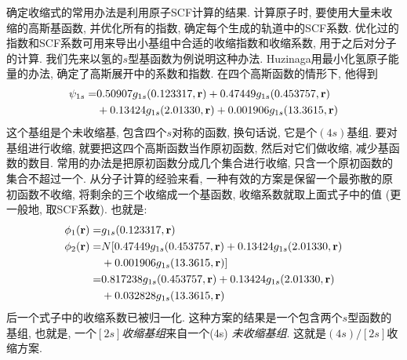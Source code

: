 确定收缩式的常用办法是利用原子SCF计算的结果. 计算原子时, 要使用大量未收缩的高斯基函数, 并优化所有的指数, 确定每个生成的轨道中的SCF系数. 优化过的指数和SCF系数可用来导出小基组中合适的收缩指数和收缩系数, 用于之后对分子的计算. 我们先来以氢的$s$型基函数为例说明这种办法. Huzinaga用最小化氢原子能量的办法, 确定了高斯展开中的系数和指数. 在四个高斯函数的情形下, 他得到
\begin{align}
\psi_{1s} = &   0.50907g_{1s}(0.123317,\mathbf{r}) + 0.47449 g_{1s}(0.453757,\mathbf{r}) \notag\\
            & + 0.13424 g_{1s}(2.01330,\mathbf{r}) + 0.001906 g_{1s}(13.3615,\mathbf{r})
\end{align}
这个基组是个未收缩基, 包含四个$s$对称的函数, 换句话说, 它是个$(4s)$基组. 要对基组进行收缩, 就要把这四个高斯函数当作原初函数, 然后对它们做收缩, 减少基函数的数目. 常用的办法是把原初函数分成几个集合进行收缩, 只含一个原初函数的集合不超过一个. 从分子计算的经验来看, 一种有效的方案是保留一个最弥散的原初函数不收缩, 将剩余的三个收缩成一个基函数, 收缩系数就取上面式子中的值 (更一般地, 取SCF系数). 也就是:
\begin{align}
\phi_1(\mathbf{r}) = & g_{1s}(0.123317,\mathbf{r})\\
\phi_2(\mathbf{r}) = & N[0.47449g_{1s}(0.453757,\mathbf{r})+ 0.13424 g_{1s}(2.01330,\mathbf{r}) \notag\\
             & + 0.001906 g_{1s}(13.3615,\mathbf{r})]\\
             = & 0.817238g_{1s}(0.453757,\mathbf{r})+ 0.13424 g_{1s}(2.01330,\mathbf{r})\\
             & +0.032828 g_{1s}(13.3615,\mathbf{r})
\end{align}
后一个式子中的收缩系数已被归一化. 这种方案的结果是一个包含两个$s$型函数的基组, 也就是, 一个\emph{$[2s]$收缩基组}来自一个(4s) \emph{未收缩基组}. 这就是$(4s)/[2s]$收缩方案.

